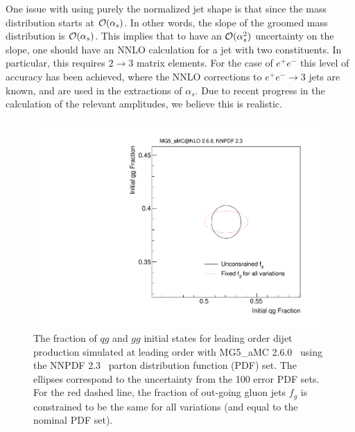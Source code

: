 One issue with using purely the normalized jet shape is that since the mass distribution starts at ${\mathcal O}(\alpha_s)$. In other words, the slope of the groomed mass distribution is ${\mathcal O}(\alpha_s)$. This implies that to have an ${\mathcal O}(\alpha_s^2)$ uncertainty on the slope, one should have an NNLO calculation for a jet with two constituents.  In particular, this requires $2\to 3$ matrix elements. For the case of $e^+e^-$ this level of accuracy has been achieved, where the NNLO corrections to $e^+e^-\to 3$ jets are known, and are used in the extractions of $\alpha_s$. Due to recent progress in the calculation of the relevant amplitudes, we believe this is realistic.



\begin{figure}[h!]
\begin{center}
\includegraphics[width = 0.5\columnwidth]{figures/PDFs.pdf}
\end{center}
\caption{The fraction of $qg$ and $gg$ initial states for leading order dijet production simulated at leading order with MG5\_aMC 2.6.0~\cite{Alwall:2014hca} using the NNPDF 2.3~\cite{Ball:2012cx} parton distribution function (PDF) set.  The ellipses correspond to the uncertainty from the 100 error PDF sets.  For the red dashed line, the fraction of out-going gluon jets $f_g$ is constrained to be the same for all variations (and equal to the nominal PDF set).}
\label{fig:pdf}
\end{figure}





























